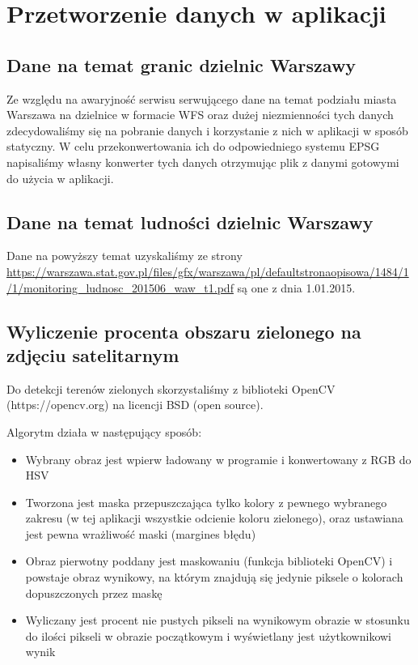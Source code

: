 \documentclass[11pt]{article}
\begin{document}
	\section{Przetworzenie danych w aplikacji}

	\subsection{Dane na temat granic dzielnic Warszawy}
	Ze względu na awaryjność serwisu serwującego dane na temat podziału miasta Warszawa na dzielnice w formacie WFS oraz dużej niezmienności tych danych zdecydowaliśmy się na pobranie danych i korzystanie z nich w aplikacji w sposób statyczny. W celu przekonwertowania ich do odpowiedniego systemu EPSG napisaliśmy własny konwerter tych danych otrzymując plik z danymi gotowymi do użycia w aplikacji.

	\subsection{Dane na temat ludności dzielnic Warszawy}
	Dane na powyższy temat uzyskaliśmy ze strony \url{https://warszawa.stat.gov.pl/files/gfx/warszawa/pl/defaultstronaopisowa/1484/1/1/monitoring_ludnosc_201506_waw_t1.pdf} są one z dnia 1.01.2015.

	\subsection{Wyliczenie procenta obszaru zielonego na zdjęciu satelitarnym}
	Do detekcji terenów zielonych skorzystaliśmy z biblioteki OpenCV (https://opencv.org) na licencji BSD (open source). 

	Algorytm działa w następujący sposób:
	\begin{itemize}
	\item Wybrany obraz jest wpierw ładowany w programie i konwertowany z RGB do HSV
	\item Tworzona jest maska przepuszczająca tylko kolory z pewnego wybranego zakresu (w tej aplikacji wszystkie odcienie koloru zielonego), oraz ustawiana jest pewna wrażliwość maski (margines błędu)
	\item Obraz pierwotny poddany jest maskowaniu (funkcja biblioteki OpenCV) i powstaje obraz wynikowy, na którym znajdują się jedynie piksele o kolorach dopuszczonych przez maskę
	\item Wyliczany jest procent nie pustych pikseli na wynikowym obrazie w stosunku do ilości pikseli w obrazie początkowym i wyświetlany jest użytkownikowi wynik
	\end{itemize}
\end{document}
